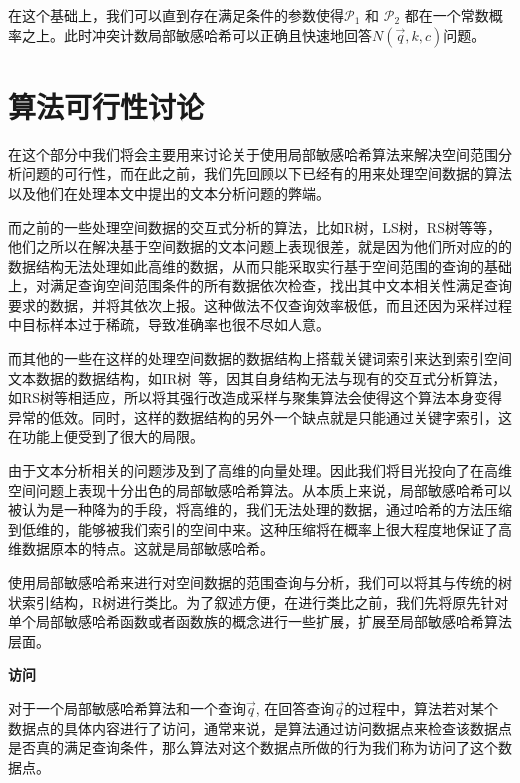 在这个基础上，我们可以直到存在满足条件的参数使得$ \mathcal{P}_1 $ 和 $ \mathcal{P}_2 $ 都在一个常数概率之上。此时冲突计数局部敏感哈希可以正确且快速地回答$ N(\vec{q},k,c) $问题。


\section{算法可行性讨论}

\label{LSHdiscuss}

在这个部分中我们将会主要用来讨论关于使用局部敏感哈希算法来解决空间范围分析问题的可行性，而在此之前，我们先回顾以下已经有的用来处理空间数据的算法以及他们在处理本文中提出的文本分析问题的弊端。

而之前的一些处理空间数据的交互式分析的算法，比如R树，LS树，RS树等等，他们之所以在解决基于空间数据的文本问题上表现很差，就是因为他们所对应的的数据结构无法处理如此高维的数据，从而只能采取实行基于空间范围的查询的基础上，对满足查询空间范围条件的所有数据依次检查，找出其中文本相关性满足查询要求的数据，并将其依次上报。这种做法不仅查询效率极低，而且还因为采样过程中目标样本过于稀疏，导致准确率也很不尽如人意。

而其他的一些在这样的处理空间数据的数据结构上搭载关键词索引来达到索引空间文本数据的数据结构，如IR树~\cite{irtree}等，因其自身结构无法与现有的交互式分析算法，如RS树等相适应，所以将其强行改造成采样与聚集算法会使得这个算法本身变得异常的低效。同时，这样的数据结构的另外一个缺点就是只能通过关键字索引，这在功能上便受到了很大的局限。

由于文本分析相关的问题涉及到了高维的向量处理。因此我们将目光投向了在高维空间问题上表现十分出色的局部敏感哈希算法。从本质上来说，局部敏感哈希可以被认为是一种降为的手段，将高维的，我们无法处理的数据，通过哈希的方法压缩到低维的，能够被我们索引的空间中来。这种压缩将在概率上很大程度地保证了高维数据原本的特点。这就是局部敏感哈希。

使用局部敏感哈希来进行对空间数据的范围查询与分析，我们可以将其与传统的树状索引结构，R树进行类比。为了叙述方便，在进行类比之前，我们先将原先针对单个局部敏感哈希函数或者函数族的概念进行一些扩展，扩展至局部敏感哈希算法层面。

\begin{definition}
	{\bf 访问}
	
	对于一个局部敏感哈希算法和一个查询$ \vec{q} $, 在回答查询$ \vec{q} $的过程中，算法若对某个数据点的具体内容进行了访问，通常来说，是算法通过访问数据点来检查该数据点是否真的满足查询条件，那么算法对这个数据点所做的行为我们称为访问了这个数据点。
\end{definition}


